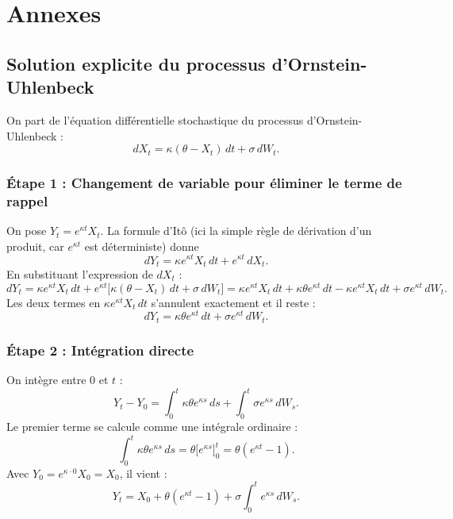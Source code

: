 \chapter*{Annexes}

\renewcommand{\thesection}{\Alph{section}}
\setcounter{section}{0}

\section{Solution explicite du processus d'Ornstein-Uhlenbeck}
\label{ann:ou_solution}

On part de l'équation différentielle stochastique du processus d'Ornstein-Uhlenbeck :
\[
    dX_t = \kappa(\theta - X_t)\,dt + \sigma\,dW_t.
\]

\subsection*{Étape 1 : Changement de variable pour éliminer le terme de rappel}

On pose $Y_t = e^{\kappa t} X_t$. La formule d'Itô (ici la simple règle de dérivation d'un produit, car $e^{\kappa t}$ est déterministe) donne
\[
    dY_t = \kappa e^{\kappa t} X_t\,dt + e^{\kappa t}\,dX_t.
\]
En substituant l'expression de $dX_t$ :
\[
    dY_t = \kappa e^{\kappa t} X_t\,dt + e^{\kappa t}\bigl[\kappa(\theta - X_t)\,dt + \sigma\,dW_t\bigr]
    = \kappa e^{\kappa t} X_t\,dt + \kappa\theta e^{\kappa t}\,dt - \kappa e^{\kappa t} X_t\,dt + \sigma e^{\kappa t}\,dW_t.
\]
Les deux termes en $\kappa e^{\kappa t} X_t\,dt$ s'annulent exactement et il reste :
\[
    dY_t = \kappa\theta e^{\kappa t}\,dt + \sigma e^{\kappa t}\,dW_t.
\]

\subsection*{Étape 2 : Intégration directe}

On intègre entre $0$ et $t$ :
\[
    Y_t - Y_0 = \int_0^t \kappa\theta e^{\kappa s}\,ds + \int_0^t \sigma e^{\kappa s}\,dW_s.
\]
Le premier terme se calcule comme une intégrale ordinaire :
\[
    \int_0^t \kappa\theta e^{\kappa s}\,ds = \theta\bigl[e^{\kappa s}\bigr]_0^t = \theta(e^{\kappa t} - 1).
\]
Avec $Y_0 = e^{\kappa \cdot 0} X_0 = X_0$, il vient :
\[
    Y_t = X_0 + \theta(e^{\kappa t} - 1) + \sigma\int_0^t e^{\kappa s}\,dW_s.
\]

